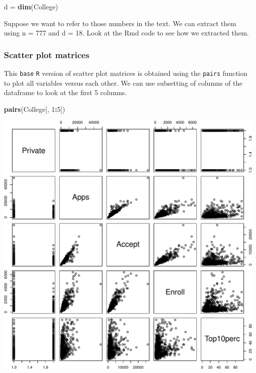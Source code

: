 \documentclass[]{article}
\newenvironment{Shaded}{\begin{snugshade}}{\end{snugshade}}
\newcommand{\KeywordTok}[1]{\textcolor[rgb]{0.13,0.29,0.53}{\textbf{#1}}}
\newcommand{\DecValTok}[1]{\textcolor[rgb]{0.00,0.00,0.81}{#1}}
\newcommand{\StringTok}[1]{\textcolor[rgb]{0.31,0.60,0.02}{#1}}
\newcommand{\OperatorTok}[1]{\textcolor[rgb]{0.81,0.36,0.00}{\textbf{#1}}}
\newcommand{\NormalTok}[1]{#1}
\begin{document}
\begin{Shaded}
\begin{Highlighting}[]
\NormalTok{d =}\StringTok{ }\KeywordTok{dim}\NormalTok{(College)}
\end{Highlighting}
\end{Shaded}

Suppose we want to refer to those numbers in the text. We can extract
them using n = 777 and d = 18. Look at the Rmd code to see how we
extracted them.

\subsubsection{Scatter plot matrices}\label{scatter-plot-matrices}

This \texttt{base} \texttt{R} version of scatter plot matrices is
obtained using the \texttt{pairs} function to plot all variables versus
each other. We can use subsetting of columns of the dataframe to look at
the first 5 columns.

\begin{Shaded}
\begin{Highlighting}[]
\KeywordTok{pairs}\NormalTok{(College[, }\DecValTok{1}\OperatorTok{:}\DecValTok{5}\NormalTok{])}
\end{Highlighting}
\end{Shaded}

\includegraphics{Lab1Q_files/figure-latex/unnamed-chunk-5-1.pdf}
\end{document}
